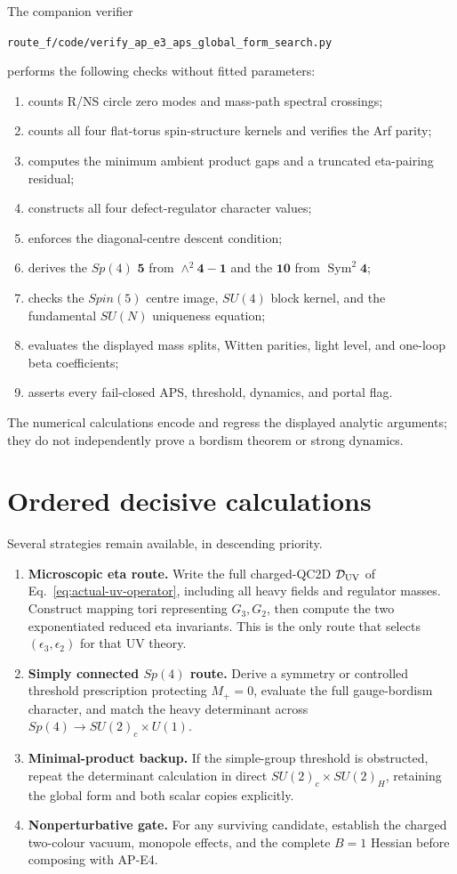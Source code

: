 \documentclass[11pt]{article}
\theoremstyle{definition}
\theoremstyle{remark}
\begin{document}
The companion verifier
\begin{center}
\texttt{route\_f/code/verify\_ap\_e3\_aps\_global\_form\_search.py}
\end{center}
performs the following checks without fitted parameters:
\begin{enumerate}
\item counts R/NS circle zero modes and mass-path spectral crossings;
\item counts all four flat-torus spin-structure kernels and verifies the Arf
  parity;
\item computes the minimum ambient product gaps and a truncated eta-pairing
  residual;
\item constructs all four defect-regulator character values;
\item enforces the diagonal-centre descent condition;
\item derives the \(Sp(4)\) \(\bm5\) from \(\wedge^2\bm4-\bm1\) and the
  \(\bm{10}\) from \(\operatorname{Sym}^2\bm4\);
\item checks the \(Spin(5)\) centre image, \(SU(4)\) block kernel, and the
  fundamental \(SU(N)\) uniqueness equation;
\item evaluates the displayed mass splits, Witten parities, light level, and
  one-loop beta coefficients;
\item asserts every fail-closed APS, threshold, dynamics, and portal flag.
\end{enumerate}
The numerical calculations encode and regress the displayed analytic
arguments; they do not independently prove a bordism theorem or strong
dynamics.

\section{Ordered decisive calculations}

Several strategies remain available, in descending priority.
\begin{enumerate}
\item \textbf{Microscopic eta route.}  Write the full charged-QC2D
  \(\mathcal D_{\rm UV}\) of Eq.~\eqref{eq:actual-uv-operator}, including all
  heavy fields and regulator masses.  Construct mapping tori representing
  \(G_3,G_2\), then compute the two exponentiated reduced eta invariants.
  This is the only route that selects \((\epsilon_3,\epsilon_2)\) for that
  UV theory.
\item \textbf{Simply connected \(Sp(4)\) route.}  Derive a symmetry or
  controlled threshold prescription protecting \(M_+=0\), evaluate the
  full gauge-bordism character, and match the heavy determinant across
  \(Sp(4)\to SU(2)_c\times U(1)\).
\item \textbf{Minimal-product backup.}  If the simple-group threshold is
  obstructed, repeat the determinant calculation in direct
  \(SU(2)_c\times SU(2)_H\), retaining the global form and both scalar
  copies explicitly.
\item \textbf{Nonperturbative gate.}  For any surviving candidate, establish
  the charged two-colour vacuum, monopole effects, and the complete \(B=1\)
  Hessian before composing with AP-E4.
\end{enumerate}
\end{document}
